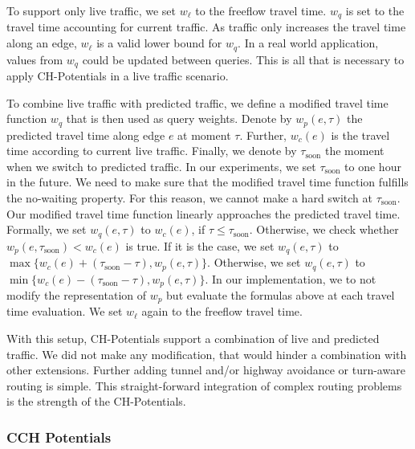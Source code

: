 \documentclass[manuscript,review]{acmart}
\begin{document}
To support only live traffic, we set $w_\ell$ to the freeflow travel time.
$w_q$ is set to the travel time accounting for current traffic.
As traffic only increases the travel time along an edge, $w_\ell$ is a valid lower bound for $w_q$.
In a real world application, values from $w_q$ could be updated between queries.
This is all that is necessary to apply CH-Potentials in a live traffic scenario.

To combine live traffic with predicted traffic, we define a modified travel time function $w_q$ that is then used as query weights.
Denote by $w_p(e,\tau)$ the predicted travel time along edge $e$ at moment $\tau$.
Further, $w_c(e)$ is the travel time according to current live traffic.
Finally, we denote by $\tau_{\mathrm{soon}}$ the moment when we switch to predicted traffic.
In our experiments, we set $\tau_{\mathrm{soon}}$ to one hour in the future.
We need to make sure that the modified travel time function fulfills the no-waiting property.
For this reason, we cannot make a hard switch at $\tau_{\mathrm{soon}}$.
Our modified travel time function linearly approaches the predicted travel time. %
%
Formally, we set $w_q(e,\tau)$ to $w_c(e)$, if $\tau \leq \tau_{\mathrm{soon}}$.
Otherwise, we check whether $w_p(e,\tau_{\mathrm{soon}}) < w_c(e)$ is true.
If it is the case, we set $w_q(e,\tau)$ to $\max\{w_c(e)+(\tau_{\mathrm{soon}}-\tau), w_p(e,\tau)\}$.
Otherwise, we set $w_q(e,\tau)$ to $\min\{w_c(e)-(\tau_{\mathrm{soon}}-\tau), w_p(e,\tau)\}$.
In our implementation, we to not modify the representation of $w_p$ but evaluate the formulas above at each travel time evaluation.
We set $w_\ell$ again to the freeflow travel time.

With this setup, CH-Potentials support a combination of live and predicted traffic.
We did not make any modification, that would hinder a combination with other extensions.
Further adding tunnel and/or highway avoidance or turn-aware routing is simple.
This straight-forward integration of complex routing problems is the strength of the CH-Potentials.

\subsubsection{CCH Potentials}
\end{document}
